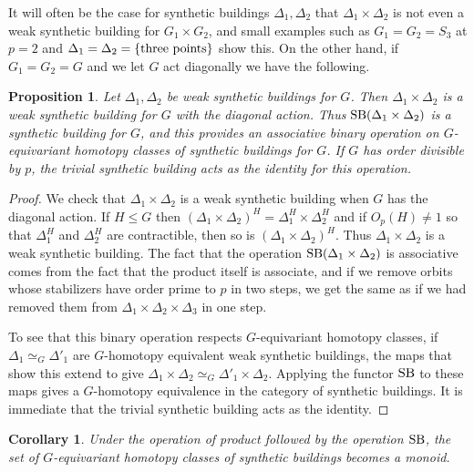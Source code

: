 \documentclass[12pt]{amsart}
\theoremstyle{plain}
\newtheorem{proposition}[theorem]{Proposition}
\newtheorem{corollary}[theorem]{Corollary}
\theoremstyle{definition}
\theoremstyle{remark}
\numberwithin{equation}{section}
\DeclareMathOperator \SB{\mathop{\rm SB}\nolimits}
\begin{document}
It will often be the case for synthetic buildings $\Delta_1,\Delta_2$ that $\Delta_1\times \Delta_2$ is not even a weak synthetic building for $G_1\times G_2$, and small examples such as $G_1=G_2=S_3$ at $p=2$ and $\Delta_1=\Delta_2 = \{\hbox{three points}\}$ show this. On the other hand, if $G_1=G_2=G$ and we let $G$ act diagonally we have the following.

\begin{proposition}
    Let $\Delta_1,\Delta_2$ be weak synthetic buildings for $G$. Then $\Delta_1\times \Delta_2$ is a weak synthetic building for $G$ with the diagonal action. Thus $\SB(\Delta_1\times \Delta_2)$ is a synthetic building for $G$, and this provides an associative binary operation on $G$-equivariant homotopy classes of synthetic buildings for $G$. If $G$ has order divisible by $p$, the trivial synthetic building acts as the identity for this operation.
\end{proposition}

\begin{proof}
We check that $\Delta_1\times \Delta_2$ is a weak synthetic building when $G$ has the diagonal action. If $H\le G$ then $(\Delta_1\times \Delta_2)^H=\Delta_1^H\times \Delta_2^H$ and if $O_p(H)\ne 1$ so that $\Delta_1^H$ and $\Delta_2^H$ are contractible, then so is $(\Delta_1\times \Delta_2)^H$. Thus $\Delta_1\times \Delta_2$ is a weak synthetic building. The fact that the operation $\SB(\Delta_1\times \Delta_2)$ is associative comes from the fact that the product itself is associate, and if we remove orbits whose stabilizers have order prime to $p$ in two steps, we get the same as if we had removed them from $\Delta_1\times \Delta_2\times\Delta_3$ in one step.

To see that this binary operation respects $G$-equivariant homotopy classes, if $\Delta_1\simeq_G\Delta'_1$ are $G$-homotopy equivalent weak synthetic buildings, the maps that show this extend to give $\Delta_1\times\Delta_2\simeq_G\Delta'_1\times\Delta_2$. Applying the functor $\SB$ to these maps gives a $G$-homotopy equivalence in the category of synthetic buildings.  It is immediate that the trivial synthetic building acts as the identity.
\end{proof}

\begin{corollary}
    Under the operation of product followed by the operation $\SB$, the set of $G$-equivariant homotopy classes of synthetic buildings becomes a monoid.
\end{corollary}
\end{document}
